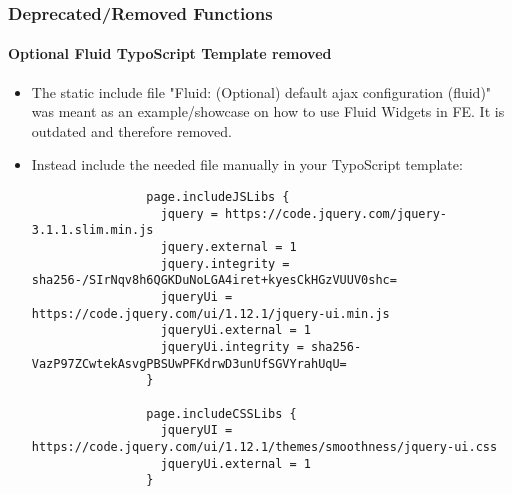 \begin{frame}[fragile]
	\frametitle{Deprecated/Removed Functions}
	\framesubtitle{Optional Fluid TypoScript Template removed}

	\lstset{basicstyle=\tiny\ttfamily}

	\begin{itemize}
		\item The static include file "Fluid: (Optional) default ajax configuration (fluid)" was meant
			as an example/showcase on how to use Fluid Widgets in FE. It is outdated and therefore removed.
		\item Instead include the needed file manually in your TypoScript template:

			\begin{lstlisting}
				page.includeJSLibs {
				  jquery = https://code.jquery.com/jquery-3.1.1.slim.min.js
				  jquery.external = 1
				  jquery.integrity = sha256-/SIrNqv8h6QGKDuNoLGA4iret+kyesCkHGzVUUV0shc=
				  jqueryUi = https://code.jquery.com/ui/1.12.1/jquery-ui.min.js
				  jqueryUi.external = 1
				  jqueryUi.integrity = sha256-VazP97ZCwtekAsvgPBSUwPFKdrwD3unUfSGVYrahUqU=
				}

				page.includeCSSLibs {
				  jqueryUI = https://code.jquery.com/ui/1.12.1/themes/smoothness/jquery-ui.css
				  jqueryUi.external = 1
				}
			\end{lstlisting}

	\end{itemize}

\end{frame}


